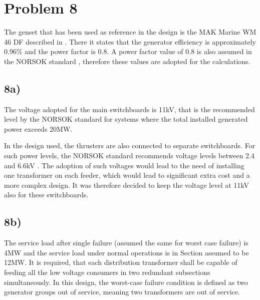 \section*{Problem 8}
The genset that has been used as reference in the design is the MAK Marine WM 46 DF described in \cite[p.128 -129]{CatGenerators}. There it states that the generator efficiency is approximately 0.96\% and the power factor is 0.8. A power factor value of 0.8 is also assumed in the NORSOK standard \cite{NORSOKstandard}, therefore these values are adopted for the calculations. 

\subsection*{8a)}
The voltage adopted for the main switchboards is 11kV, that is the recommended level by the NORSOK standard \cite[p.10]{NORSOKstandard} for systems where the total installed generated power exceeds 20MW.

In the design used, the thrusters are also connected to separate switchboards. For such power levels, the NORSOK standard recommends voltage levels between 2.4 and 6.6kV \cite{NORSOKstandard}. The adoption of such voltages would lead to the need of installing one transformer on each feeder, which would lead to significant extra cost and a more complex design. It was therefore decided to keep the voltage level at 11kV also for these switchboards. %




\subsection*{8b)}
The service load after single failure (assumed the same for worst case failure) is 4MW and the service load under normal operations is in Section  assumed to be 12MW. It is required, that each distribution transformer shall be capable of feeding all the low voltage consumers in two redundant subsections simultaneously. In this design, the worst-case failure condition is defined as two generator groups out of service, meaning two transformers are out of service. 

